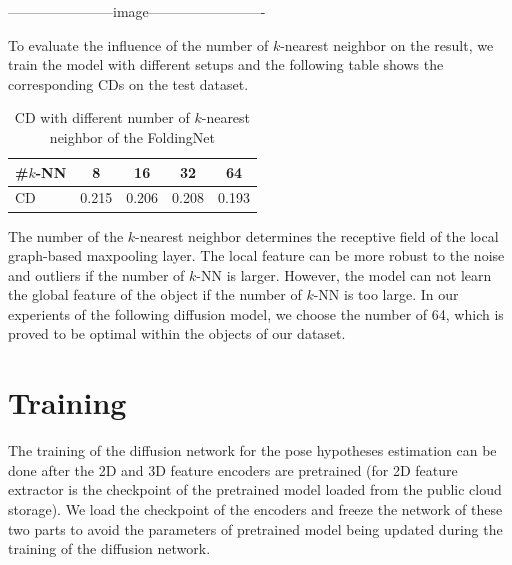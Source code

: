 \documentclass[12pt,DIV14,BCOR12mm,a4paper,footinclude=false,headinclude,parskip=half-,twoside,openright,cleardoublepage=empty,toc=index,bibliography=totoc,listof=totoc]{scrreprt}
\numberwithin{equation}{chapter}
\begin{document}
-----------------------image-------------------------

To evaluate the influence of the number of $k$-nearest neighbor on the result, we train the model with different setups and the following table shows the corresponding CDs on the test dataset.
\begin{table}[h]
  \centering
  \caption{CD with different number of $k$-nearest neighbor of the FoldingNet}
  \label{tab:fold_knn}
  \begin{tabular}{l | c c c c}
    \toprule
    \#$k$-NN & 8 & 16 & 32 & 64\\
    \midrule
    CD & 0.215 & 0.206 & 0.208 & 0.193\\
    \bottomrule
  \end{tabular}
\end{table}

The number of the $k$-nearest neighbor determines the receptive field of the local graph-based maxpooling layer. The local feature can be more robust to the noise and outliers if the number of $k$-NN is larger. However, the model can not learn the global feature of the object if the number of $k$-NN is too large. In our experients of the following diffusion model, we choose the number of 64, which is proved to be optimal within the objects of our dataset.

\section{Training} 
The training of the diffusion network for the pose hypotheses estimation can be done after the 2D and 3D feature encoders are pretrained (for 2D feature extractor is the checkpoint of the pretrained model loaded from the public cloud storage). We load the checkpoint of the encoders and freeze the network of these two parts to avoid the parameters of pretrained model being updated during the training of the diffusion network. 
\end{document}
